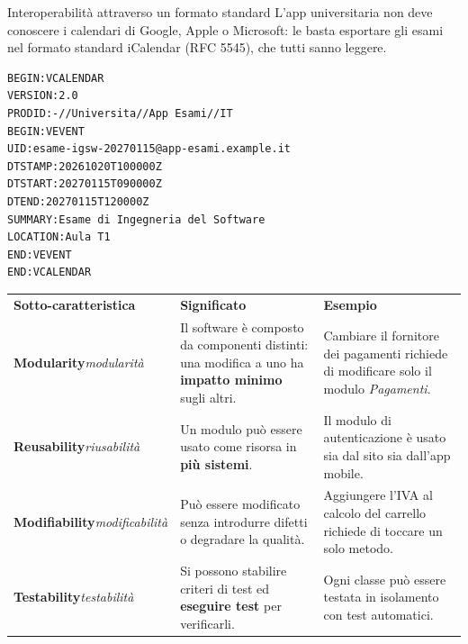 \begin{esempio}{Interoperabilità attraverso un formato standard}
L'app universitaria non deve conoscere i calendari di Google, Apple o Microsoft: le basta esportare gli esami nel formato
standard iCalendar (RFC 5545), che tutti sanno leggere.
\begin{lstlisting}[style=plain, name=esame.ics]
BEGIN:VCALENDAR
VERSION:2.0
PRODID:-//Universita//App Esami//IT
BEGIN:VEVENT
UID:esame-igsw-20270115@app-esami.example.it
DTSTAMP:20261020T100000Z
DTSTART:20270115T090000Z
DTEND:20270115T120000Z
SUMMARY:Esame di Ingegneria del Software
LOCATION:Aula T1
END:VEVENT
END:VCALENDAR
\end{lstlisting}
\end{esempio}



\begin{table}[H]
\centering
\renewcommand{\arraystretch}{1.4}
\begin{tabularx}{\textwidth}{P{3.6cm} L L}
\textbf{Sotto-caratteristica} & \textbf{Significato} & \textbf{Esempio} \\
\textbf{Modularity}\newline\textit{\small modularità} & Il software è composto da componenti distinti: una modifica a uno ha \textbf{impatto minimo} sugli altri. & Cambiare il fornitore dei pagamenti richiede di modificare solo il modulo \textit{Pagamenti}. \\
\textbf{Reusability}\newline\textit{\small riusabilità} & Un modulo può essere usato come risorsa in \textbf{più sistemi}. & Il modulo di autenticazione è usato sia dal sito sia dall'app mobile. \\
\textbf{Modifiability}\newline\textit{\small modificabilità} & Può essere modificato senza introdurre difetti o degradare la qualità. & Aggiungere l'IVA al calcolo del carrello richiede di toccare un solo metodo. \\
\textbf{Testability}\newline\textit{\small testabilità} & Si possono stabilire criteri di test ed \textbf{eseguire test} per verificarli. & Ogni classe può essere testata in isolamento con test automatici. \\
\bottomrule
\end{tabularx}
\end{table}

